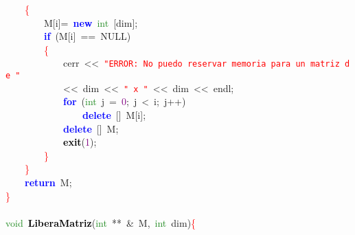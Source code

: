 \mbox{}\ \ \ \ \textcolor{Red}{\{} \\
\mbox{}\ \ \ \ \ \ \ \ M\textcolor{BrickRed}{[}i\textcolor{BrickRed}{]=}\ \textbf{\textcolor{Blue}{new}}\ \textcolor{ForestGreen}{int}\ \textcolor{BrickRed}{[}dim\textcolor{BrickRed}{];} \\
\mbox{}\ \ \ \ \ \ \ \ \textbf{\textcolor{Blue}{if}}\ \textcolor{BrickRed}{(}M\textcolor{BrickRed}{[}i\textcolor{BrickRed}{]}\ \textcolor{BrickRed}{==}\ NULL\textcolor{BrickRed}{)} \\
\mbox{}\ \ \ \ \ \ \ \ \textcolor{Red}{\{} \\
\mbox{}\ \ \ \ \ \ \ \ \ \ \ \ cerr\ \textcolor{BrickRed}{\textless{}\textless{}}\ \texttt{\textcolor{Red}{"{}ERROR:\ No\ puedo\ reservar\ memoria\ para\ un\ matriz\ de\ "{}}} \\
\mbox{}\ \ \ \ \ \ \ \ \ \ \ \ \textcolor{BrickRed}{\textless{}\textless{}}\ dim\ \textcolor{BrickRed}{\textless{}\textless{}}\ \texttt{\textcolor{Red}{"{}\ x\ "{}}}\ \textcolor{BrickRed}{\textless{}\textless{}}\ dim\ \textcolor{BrickRed}{\textless{}\textless{}}\ endl\textcolor{BrickRed}{;} \\
\mbox{}\ \ \ \ \ \ \ \ \ \ \ \ \textbf{\textcolor{Blue}{for}}\ \textcolor{BrickRed}{(}\textcolor{ForestGreen}{int}\ j\ \textcolor{BrickRed}{=}\ \textcolor{Purple}{0}\textcolor{BrickRed}{;}\ j\ \textcolor{BrickRed}{\textless{}}\ i\textcolor{BrickRed}{;}\ j\textcolor{BrickRed}{++)} \\
\mbox{}\ \ \ \ \ \ \ \ \ \ \ \ \ \ \ \ \textbf{\textcolor{Blue}{delete}}\ \textcolor{BrickRed}{[]}\ M\textcolor{BrickRed}{[}i\textcolor{BrickRed}{];} \\
\mbox{}\ \ \ \ \ \ \ \ \ \ \ \ \textbf{\textcolor{Blue}{delete}}\ \textcolor{BrickRed}{[]}\ M\textcolor{BrickRed}{;} \\
\mbox{}\ \ \ \ \ \ \ \ \ \ \ \ \textbf{\textcolor{Black}{exit}}\textcolor{BrickRed}{(}\textcolor{Purple}{1}\textcolor{BrickRed}{);} \\
\mbox{}\ \ \ \ \ \ \ \ \textcolor{Red}{\}}\  \\
\mbox{}\ \ \ \ \textcolor{Red}{\}} \\
\mbox{}\ \ \ \ \textbf{\textcolor{Blue}{return}}\ M\textcolor{BrickRed}{;} \\
\mbox{}\textcolor{Red}{\}}\ \ \  \\
\mbox{} \\
\mbox{}\textcolor{ForestGreen}{void}\ \textbf{\textcolor{Black}{LiberaMatriz}}\textcolor{BrickRed}{(}\textcolor{ForestGreen}{int}\ \textcolor{BrickRed}{**}\ \textcolor{BrickRed}{\&}\ M\textcolor{BrickRed}{,}\ \textcolor{ForestGreen}{int}\ dim\textcolor{BrickRed}{)}\textcolor{Red}{\{} \\
